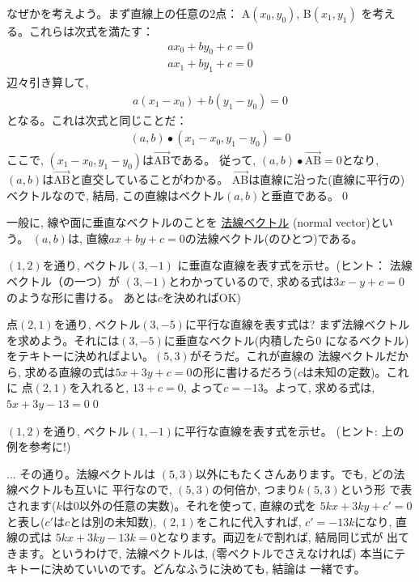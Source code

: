 なぜかを考えよう。まず直線上の任意の2点： A$(x_0, y_0)$, B$(x_1, y_1)$
を考える。これらは次式を満たす：
\begin{eqnarray}
ax_0+by_0+c=0\\
ax_1+by_1+c=0
\end{eqnarray}
辺々引き算して, 
\begin{eqnarray}
a(x_1-x_0)+b(y_1-y_0)=0
\end{eqnarray}
となる。これは次式と同じことだ：
\begin{eqnarray}
(a, b) \bullet (x_1-x_0, y_1-y_0)=0
\end{eqnarray}
ここで, $(x_1-x_0, y_1-y_0)$は$\overrightarrow{\text{AB}}$である。
従って, $(a, b) \bullet \overrightarrow{\text{AB}}=0$となり, 
$(a, b)$は$\overrightarrow{\text{AB}}$と直交していることがわかる。
$\overrightarrow{\text{AB}}$は直線に沿った(直線に平行の)ベクトルなので, 
結局, この直線はベクトル$(a, b)$と垂直である。\qed\hv

一般に, 線や面に垂直なベクトルのことを
\underline{法線ベクトル} (normal vector)という。
$(a, b)$は, 直線$ax+by+c=0$の法線ベクトル(のひとつ)である。\hv

\begin{q}\label{q:vect_line2D0} $(1, 2)$を通り, ベクトル$(3, -1)$
に垂直な直線を表す式を示せ。(ヒント： 法線ベクトル（の一つ）が
$(3, -1)$とわかっているので, 求める式は$3x-y+c=0$のような形に書ける。
あとは$c$を決めればOK)\end{q}\hv

\begin{exmpl}\label{exmpl:line_normal_2D} 
点$(2, 1)$を通り, ベクトル$(3, -5)$に平行な直線を表す式は? 
まず法線ベクトルを求めよう。それには$(3, -5)$に垂直なベクトル(内積したら0
になるベクトル)をテキトーに決めればよい。$(5, 3)$がそうだ。これが直線の
法線ベクトルだから, 求める直線の式は$5x+3y+c=0$の形に書けるだろう($c$は未知の定数)。これに
点$(2, 1)$を入れると, $13+c=0$, よって$c=-13$。よって, 求める式は, 
$5x+3y-13=0$\qed
\end{exmpl}\hv

\begin{q}\label{q:vect_line2D1} $(1, 2)$を通り, 
ベクトル$(1, -1)$に平行な直線を表す式を示せ。
(ヒント: 上の例を参考に!)
\end{q}\hv


\begin{faq}{\small{} ... その通り。法線ベクトルは
$(5, 3)$以外にもたくさんあります。でも, どの法線ベクトルも互いに
平行なので, $(5, 3)$の何倍か, つまり$k(5, 3)$という形
で表されます($k$は0以外の任意の実数)。それを使って, 直線の式を
$5kx+3ky+c'=0$と表し($c'$は$c$とは別の未知数), 
$(2, 1)$をこれに代入すれば, $c'=-13k$になり, 直線の式は
$5kx+3ky-13k=0$となります。両辺を$k$で割れば, 結局同じ式が
出てきます。というわけで, 法線ベクトルは, (零ベクトルでさえなければ)
本当にテキトーに決めていいのです。どんなふうに決めても, 結論は
一緒です。}\end{faq}\vv




